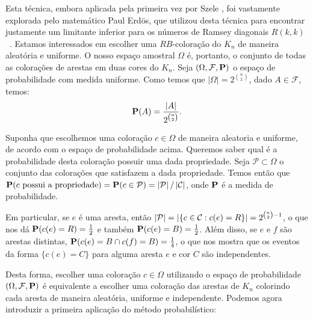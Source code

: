 Esta técnica, embora aplicada pela primeira vez por Szele \cite{szele1943kombinatorikai}, foi vastamente explorada pelo matemático Paul Erdös, que utilizou desta técnica para encontrar justamente um limitante inferior para os números de Ramsey diagonais $R(k,k)$~\cite{erdos47}. Estamos interessados em escolher uma $RB$-coloração do $K_n$ de maneira aleatória e uniforme. O nosso espaço amostral $\Omega$ é, portanto, o conjunto de todas as colorações de arestas em duas cores do $K_n$. Seja $(\Omega, \mathcal{F}, \operatorname{\mathbf{P}})$ o espaço de probabilidade com medida uniforme. Como temos que $|\Omega| = 2^{\binom{n}{2}}$, dado $A \in \mathcal{F}$, temos:
\[ \operatorname{\mathbf{P}}(A) = \frac{|A|}{2^{\binom{n}{2}}}.\]

Suponha que escolhemos uma coloração $c \in \Omega$ de maneira aleatoria e uniforme, de acordo com o espaço de probabilidade acima. Queremos saber qual é a probabilidade desta coloração possuir uma dada propriedade. Seja $\mathcal{P} \subset \Omega$ o conjunto das colorações que satisfazem a dada propriedade. Temos então que $\operatorname{\mathbf{P}}(c \text{ possui a propriedade}) = \operatorname{\mathbf{P}}(c \in \mathcal{P}) = \left | \mathcal{P} \right | / \left | \mathcal{C} \right |$, onde $\operatorname{\mathbf{P}}$ é a medida de probabilidade.

Em particular, se $e$ é uma aresta, então $\left | \mathcal{P} \right | = \left | \{c \in \mathcal{C} : c(e) = R \} \right | = 2^{\binom{n}{2}-1}$, o que nos dá $\operatorname{\mathbf{P}}(c(e) = R) = \frac{1}{2}$ e também $\operatorname{\mathbf{P}}(c(e) = B) = \frac{1}{2}$.
Além disso, se $e$ e $f$ são arestas distintas, $\operatorname{\mathbf{P}}(c(e) = B \cap c(f) = B) = \frac{1}{4}$, o que nos mostra que os eventos da forma $\{c(e) = C\}$ para alguma aresta $e$ e cor $C$ são independentes.

Desta forma, escolher uma coloração $c \in \Omega$ utilizando o espaço de probabilidade $(\Omega, \mathcal{F}, \operatorname{\mathbf{P}})$ é equivalente a escolher uma coloração das arestas de $K_n$ colorindo cada aresta de maneira aleatória, uniforme e independente. Podemos agora introduzir a primeira aplicação do método probabilístico:

